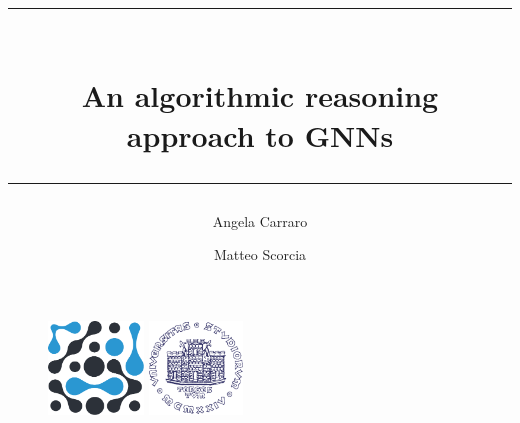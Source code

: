 \documentclass[10pt, onecolumn]{article}
\title{\rule{\textwidth}{0.4pt}\\\huge{An algorithmic reasoning\\approach to GNNs}\\\rule{\textwidth}{0.4pt}}
\author{\Large{Angela Carraro}}
\author{\Large{Matteo Scorcia}}
\affil{\Large{DSSC + IN20 - UniTS}}
\date{}
\begin{document}
\maketitle

\begin{figure}
    \centering
    \includegraphics[height=2.5cm]{figures/logo_dssc_alt.pdf}
    \hspace*{1cm}
    \includegraphics[height=2.5cm]{figures/Logo_units_blu.pdf}
\end{figure}

\newpage

\tableofcontents

\newpage












\printindex

\newpage

\nocite{*}

\end{document}
